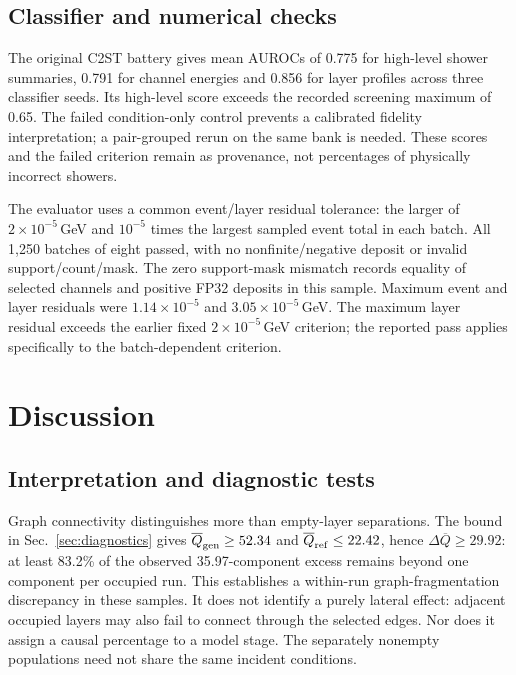 \documentclass[11pt]{article}
\begin{document}
\subsection{Classifier and numerical checks}

The original C2ST battery gives mean AUROCs of 0.775 for high-level shower summaries, 0.791 for channel energies and 0.856 for layer profiles across three classifier seeds. Its high-level score exceeds the recorded screening maximum of 0.65. The failed condition-only control prevents a calibrated fidelity interpretation; a pair-grouped rerun on the same bank is needed. These scores and the failed criterion remain as provenance, not percentages of physically incorrect showers.

The evaluator uses a common event/layer residual tolerance: the larger of $2\times10^{-5}$\,GeV and $10^{-5}$ times the largest sampled event total in each batch. All 1,250 batches of eight passed, with no nonfinite/negative deposit or invalid support/count/mask. The zero support-mask mismatch records equality of selected channels and positive FP32 deposits in this sample. Maximum event and layer residuals were $1.14\times10^{-5}$ and $3.05\times10^{-5}$\,GeV. The maximum layer residual exceeds the earlier fixed $2\times10^{-5}$\,GeV criterion; the reported pass applies specifically to the batch-dependent criterion.

\section{Discussion}
\label{sec:discussion}

\subsection{Interpretation and diagnostic tests}

Graph connectivity distinguishes more than empty-layer separations. The bound in Sec.~\ref{sec:diagnostics} gives $\overline Q_{\rm gen}\geq52.34$ and $\overline Q_{\rm ref}\leq22.42$, hence $\Delta\overline Q\geq29.92$: at least 83.2\% of the observed 35.97-component excess remains beyond one component per occupied run. This establishes a within-run graph-fragmentation discrepancy in these samples. It does not identify a purely lateral effect: adjacent occupied layers may also fail to connect through the selected edges. Nor does it assign a causal percentage to a model stage. The separately nonempty populations need not share the same incident conditions.
\end{document}

